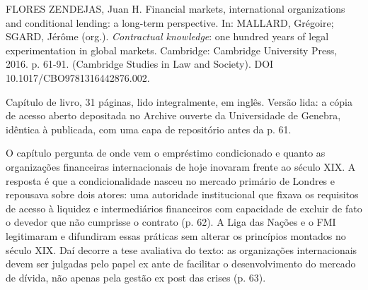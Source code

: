 
\begin{identificacao}
FLORES ZENDEJAS, Juan H. Financial markets, international organizations and
conditional lending: a long-term perspective. In: MALLARD, Grégoire; SGARD,
Jérôme (org.). \emph{Contractual knowledge}: one hundred years of legal
experimentation in global markets. Cambridge: Cambridge University Press, 2016.
p. 61-91. (Cambridge Studies in Law and Society). DOI 10.1017/CBO9781316442876.002.

Capítulo de livro, 31 páginas, lido integralmente, em inglês. Versão lida: a
cópia de acesso aberto depositada no Archive ouverte da Universidade de Genebra,
idêntica à publicada, com uma capa de repositório antes da p. 61.
\end{identificacao}

O capítulo pergunta de onde vem o empréstimo condicionado e quanto as
organizações financeiras internacionais de hoje inovaram frente ao século XIX. A
resposta é que a condicionalidade nasceu no mercado primário de Londres e
repousava sobre dois atores: uma autoridade institucional que fixava os
requisitos de acesso à liquidez e intermediários financeiros com capacidade de
excluir de fato o devedor que não cumprisse o contrato (p. 62). A Liga das
Nações e o FMI legitimaram e difundiram essas práticas sem alterar os princípios
montados no século XIX. Daí decorre a tese avaliativa do texto: as organizações
internacionais devem ser julgadas pelo papel ex ante de facilitar o
desenvolvimento do mercado de dívida, não apenas pela gestão ex post das crises
(p. 63).

